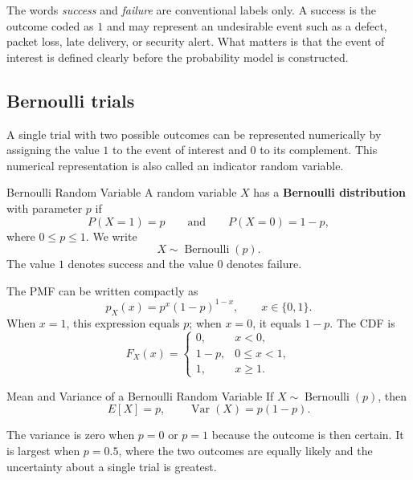 The words \emph{success} and \emph{failure} are conventional labels only. A success is the outcome coded as $1$ and may represent an undesirable event such as a defect, packet loss, late delivery, or security alert. What matters is that the event of interest is defined clearly before the probability model is constructed.

\subsection{Bernoulli trials}

A single trial with two possible outcomes can be represented numerically by assigning the value $1$ to the event of interest and $0$ to its complement. This numerical representation is also called an indicator random variable.

\begin{definition}{Bernoulli Random Variable}
    A random variable $X$ has a \textbf{Bernoulli distribution} with parameter $p$ if
    \[
    P(X=1)=p
    \qquad\text{and}\qquad
    P(X=0)=1-p,
    \]
    where $0\leq p\leq1$. We write
    \[
    X\sim\operatorname{Bernoulli}(p).
    \]
    The value $1$ denotes success and the value $0$ denotes failure.
\end{definition}

The PMF can be written compactly as
\[
p_X(x)=p^x(1-p)^{1-x},
\qquad x\in\{0,1\}.
\]
When $x=1$, this expression equals $p$; when $x=0$, it equals $1-p$. The CDF is
\[
F_X(x)=
\begin{cases}
0, & x<0,\\
1-p, & 0\leq x<1,\\
1, & x\geq1.
\end{cases}
\]

\begin{theorem}{Mean and Variance of a Bernoulli Random Variable}
    If $X\sim\operatorname{Bernoulli}(p)$, then
    \[
    E[X]=p,
    \qquad
    \operatorname{Var}(X)=p(1-p).
    \]
\end{theorem}

The variance is zero when $p=0$ or $p=1$ because the outcome is then certain. It is largest when $p=0.5$, where the two outcomes are equally likely and the uncertainty about a single trial is greatest.

